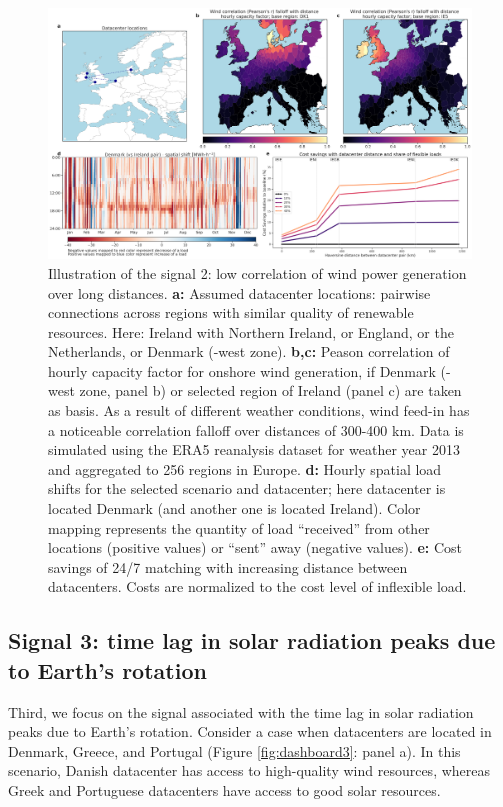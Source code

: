 \begin{figure}[h]
    \centering
    \includegraphics[width=1\textwidth]{img/dashboard_2.png}
    \caption{Illustration of the signal 2: low correlation of wind power generation over long distances.
    \textbf{a:} Assumed datacenter locations: pairwise connections across regions with similar quality of renewable resources. Here: Ireland with Northern Ireland, or England, or the Netherlands, or Denmark (-west zone).
    \textbf{b,c:} Peason correlation of hourly capacity factor for onshore wind generation, if Denmark (-west zone, panel b) or selected region of Ireland (panel c) are taken as basis. As a result of different weather conditions, wind feed-in has a noticeable correlation falloff over distances of 300-400 km. Data is simulated using the ERA5 reanalysis dataset for weather year 2013 and aggregated to 256 regions in Europe.
    \textbf{d:} Hourly spatial load shifts for the selected scenario and datacenter; here datacenter is located Denmark (and another one is located Ireland). Color mapping represents the quantity of load \enquote{received} from other locations (positive values) or \enquote{sent} away (negative values).
    \textbf{e:} Cost savings of 24/7 matching with increasing distance between datacenters. Costs are normalized to the cost level of inflexible load.}
    \label{fig:dashboard2}
\end{figure}%

\subsection{Signal 3: time lag in solar radiation peaks due to Earth's rotation}

Third, we focus on the signal associated with the time lag in solar radiation peaks due to Earth's rotation. Consider a case when datacenters are located in Denmark, Greece, and Portugal (Figure \ref{fig:dashboard3}: panel a). In this scenario, Danish datacenter has access to high-quality wind resources, whereas Greek and Portuguese datacenters have access to good solar resources.

